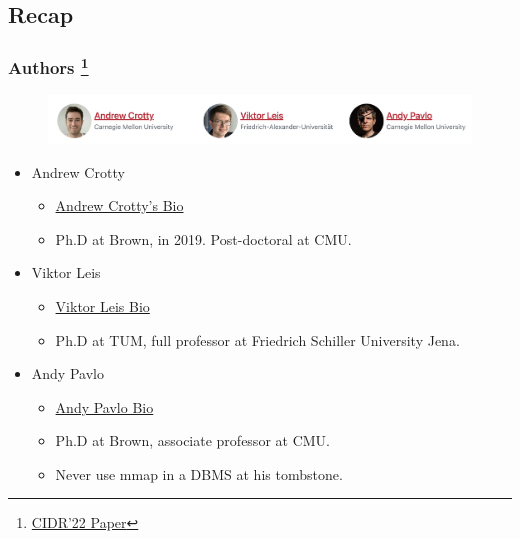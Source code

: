 \documentclass[10pt,svgnames,fragile]{beamer}
\begin{document}
\subsection{Recap}
\begin{frame}
	\frametitle{Authors \footnote[frame]{\href{http://www.cidrdb.org/cidr2022/papers/p13-crotty.pdf}{CIDR'22 Paper}}}
	\begin{figure}[h]
		\includegraphics[width=0.99\linewidth]{images/author.png}
	\end{figure}
	\begin{itemize}
		\item Andrew Crotty
		\begin{itemize}
			\item[\checkmark] \href{https://cs.brown.edu/people/acrotty/}{\color{blue}Andrew Crotty's Bio}
			\item[\checkmark] Ph.D at Brown, in 2019. Post-doctoral at CMU.
		\end{itemize}
		\item Viktor Leis
		\begin{itemize}
			\item[\checkmark] \href{https://dbis1.github.io/team/leis}{\color{blue}Viktor Leis Bio}
			\item[\checkmark] Ph.D at TUM,  full professor at Friedrich Schiller University Jena.
		\end{itemize}
		\item Andy Pavlo
		\begin{itemize}
			\item[\checkmark] \href{https://www.cs.cmu.edu/\~pavlo/}{\color{blue}Andy Pavlo Bio}
			\item[\checkmark] Ph.D at Brown, associate professor at CMU.
			\item[\checkmark] {\color{red}Never use mmap in a DBMS at his tombstone.}
		\end{itemize}
	\end{itemize}
\end{frame}
\end{document}
